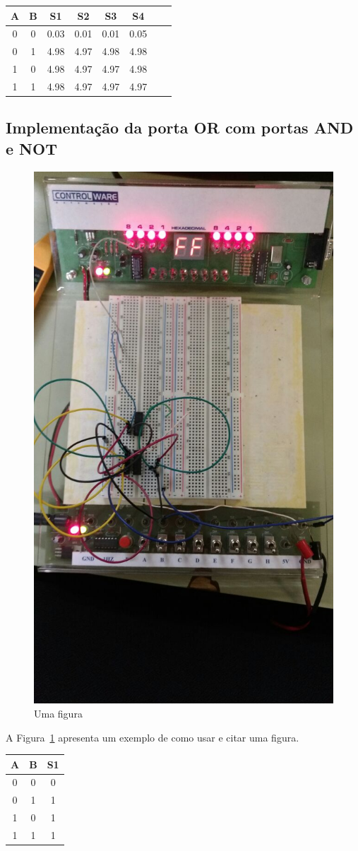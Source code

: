\documentclass[12pt]{article}
\begin{document}
\begin{table}
	\centering
	\begin{tabular}{|c|c|c|c|c|c|c|c|}
	\cline{1-6}
	\multicolumn{1}{|c|}{A} & \multicolumn{1}{|c|}{B} & \multicolumn{1}{|c|}{S1} & \multicolumn{1}{|c|}{S2} & \multicolumn{1}{|c|}{S3} & \multicolumn{1}{|c|}{S4}\\
	\hline
	0 & 0 & 0.03 & 0.01 & 0.01 & 0.05\\
	0 & 1 & 4.98 & 4.97 & 4.98 & 4.98\\
	1 & 0 & 4.98 & 4.97 & 4.97 & 4.98\\
	1 & 1 & 4.98 & 4.97 & 4.97 & 4.97\\
	\hline
	\end{tabular}
	\label{Porta OR}
\end{table}


\subsection{Implementação da porta OR com portas AND e NOT}
\label{sec:NOTAND}

\begin{figure}[H]
\centering
\includegraphics[width=.5\textwidth]{Porta_OR.jpeg}
\caption{Uma figura}
\label{fig:portaor}
\end{figure}

A Figura~\ref{fig:portaor} apresenta um exemplo de como usar e citar uma figura.

\begin{table}
	\centering
	\begin{tabular}{|c|c|c|}
	\cline{1-3}
	\multicolumn{1}{|c|}{A} & \multicolumn{1}{|c|}{B} & \multicolumn{1}{|c|}{S1}\\
	\hline
	0 & 0 & 0 \\
	0 & 1 & 1 \\
	1 & 0 & 1 \\
	1 & 1 & 1 \\
	\hline
	\end{tabular}
	\label{ANDNOTOR}
\end{table}
\end{document}
